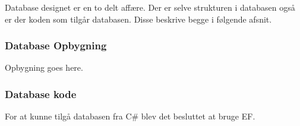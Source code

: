 Database designet er en to delt affære. Der er selve strukturen i databasen også er der koden som tilgår databasen.
Disse beskrive begge i følgende afsnit.

\subsubsection{Database Opbygning}
Opbygning goes here.

\subsubsection{Database kode}
For at kunne tilgå databasen fra C\# blev det besluttet at bruge \gls{EF}. 